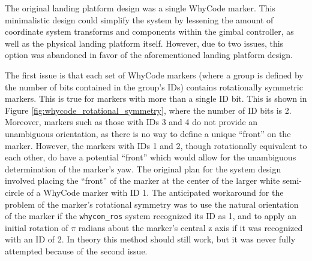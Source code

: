 The original landing platform design was a single WhyCode marker. This minimalistic design could simplify the system by lessening the amount of coordinate system transforms and components within the gimbal controller, as well as the physical landing platform itself. However, due to two issues, this option was abandoned in favor of the aforementioned landing platform design.

The first issue is that each set of WhyCode markers (where a group is defined by the number of bits contained in the group's IDs) contains rotationally symmetric markers. This is true for markers with more than a single ID bit. This is shown in Figure \ref{fig:whycode_rotational_symmetry}, where the number of ID bits is 2. Moreover, markers such as those with IDs 3 and 4 do not provide an unambiguous orientation, as there is no way to define a unique ``front'' on the marker. However, the markers with IDs 1 and 2, though rotationally equivalent to each other, do have a potential ``front'' which would allow for the unambiguous determination of the marker's yaw. The original plan for the system design involved placing the ``front'' of the marker at the center of the larger white semi-circle of a WhyCode marker with ID 1. The anticipated workaround for the problem of the marker's rotational symmetry was to use the natural orientation of the marker if the \texttt{whycon\_ros} system recognized its ID as 1, and to apply an initial rotation of $\pi$ radians about the marker's central z axis if it was recognized with an ID of 2. In theory this method should still work, but it was never fully attempted because of the second issue.

